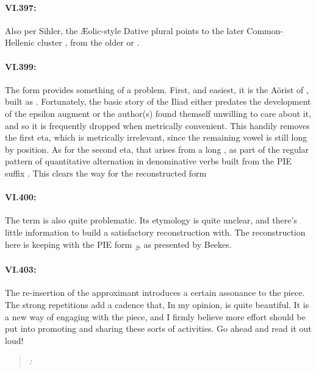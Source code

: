\paragraph{VI.397: } Also per Sihler, the \AE olic-style Dative plural  points to the later Common-Hellenic cluster , from the older  or .\autocite[196]{Sihler_1995} 

\paragraph{VI.399: } The form  provides something of a problem. First, and easiest, it is the A\"orist of , built as . Fortunately, the basic story of the Iliad either predates the development of the epsilon augment or the author(s) found themself unwilling to care about it, and so it is frequently dropped when metrically convenient. This handily removes the first eta, which is metrically irrelevant, since the remaining vowel is still long by position. As for the second eta, that arises from a long , as part of the regular pattern of quantitative alternation in denominative verbs built from the PIE suffix .\autocite[462]{Sihler_1995} This clears the way for the reconstructed form 

\paragraph{VI.400: } The term  is also quite problematic. Its etymology is quite unclear, and there's little information to build a satisfactory reconstruction with. The reconstruction here is keeping with the PIE form \textit{\textsubscript{2}}, as presented by Beekes.\autocite[νήπιος]{Beekes_2009}

\paragraph{VI.403: } The re-insertion of the approximant  introduces a certain assonance to the piece. The strong repetitions add a cadence that, In my opinion, is quite beautiful. It is a new way of engaging with the piece, and I firmly believe more effort should be put into promoting and sharing these sorts of activities. Go ahead and read it out loud!

\begin{quote}
    \textit{:} 
\end{quote}